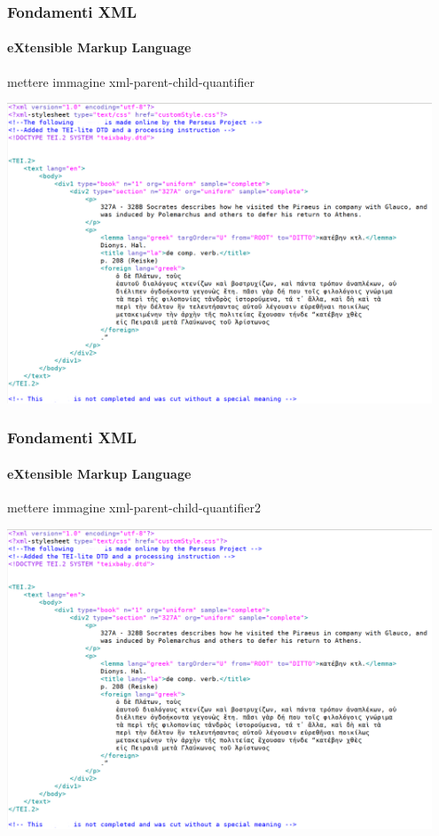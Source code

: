 


\begin{frame}
	\frametitle{Fondamenti XML}
	\framesubtitle{eXtensible Markup Language}
	\addtocounter{nframe}{1}

	\begin{center}
		mettere immagine xml-parent-child-quantifier

		\includegraphics[width=0.95\textwidth]{imgs/xml-TEI-PerseusExample.png}
	\end{center}

\end{frame}

\begin{frame}
	\frametitle{Fondamenti XML}
	\framesubtitle{eXtensible Markup Language}
	\addtocounter{nframe}{1}

	\begin{center}
		mettere immagine xml-parent-child-quantifier2

		\includegraphics[width=0.95\textwidth]{imgs/xml-TEI-PerseusExample.png}
	\end{center}

\end{frame}


